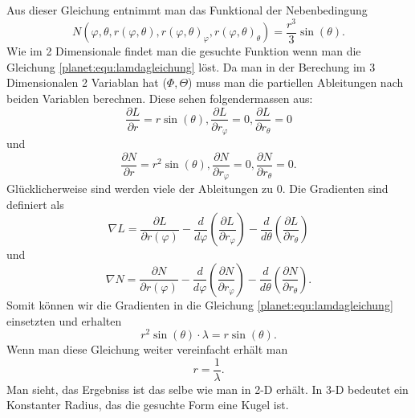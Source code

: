 Aus dieser Gleichung entnimmt man das Funktional der Nebenbedingung
\begin{equation*}
	N(\varphi,\theta ,r(\varphi,\theta),r(\varphi,\theta)_\varphi,r(\varphi,\theta)_\theta) = \frac{r^3}{3} \sin (\theta).
\end{equation*}
Wie im 2 Dimensionale findet man die gesuchte Funktion wenn man die Gleichung \ref{planet:equ:lamdagleichung} löst.
Da man in der Berechung im 3 Dimensionalen 2 Variablan hat (\(\Phi,\Theta\)) muss man die partiellen Ableitungen nach beiden Variablen berechnen.
Diese sehen folgendermassen aus:
\begin{equation*}
	\frac{\partial L}{\partial r} = r  \sin (\theta) ,
	\frac{\partial L}{\partial r_\varphi} = 0 ,
	\frac{\partial L}{\partial r_\theta} = 0
\end{equation*}
und
\begin{equation*}
	\frac{\partial N}{\partial r} = r^2\sin (\theta) ,
	\frac{\partial N}{\partial r_\varphi} = 0 ,
	\frac{\partial N}{\partial r_\theta} = 0.
\end{equation*}
Glücklicherweise sind werden viele der Ableitungen zu 0.
Die Gradienten sind definiert als
\begin{equation*}
	\nabla L =  \frac{\partial L}{\partial r(\varphi)} 
	-\frac{d}{d\varphi}\left( \frac{\partial L}{\partial r_\varphi} \right)
	-\frac{d}{d\theta}\left( \frac{\partial L}{\partial r_\theta} \right)
\end{equation*}
und
\begin{equation*}
	\nabla N=  \frac{\partial N}{\partial r(\varphi)} 
	-\frac{d}{d\varphi}\left( \frac{\partial N}{\partial r_\varphi} \right)
	-\frac{d}{d\theta}\left( \frac{\partial N}{\partial r_\theta} \right).
\end{equation*}
Somit können wir die Gradienten in die Gleichung \ref{planet:equ:lamdagleichung} einsetzten und erhalten
\begin{equation*}
	r^2\sin (\theta) \cdot \lambda = r \sin (\theta).
\end{equation*}
Wenn man diese Gleichung weiter vereinfacht erhält man
\begin{equation*}
	r = \frac{1}{\lambda}.
\end{equation*}
Man sieht, das Ergebniss ist das selbe wie man in 2-D erhält.
In 3-D bedeutet ein Konstanter Radius, das die gesuchte Form eine Kugel ist.
